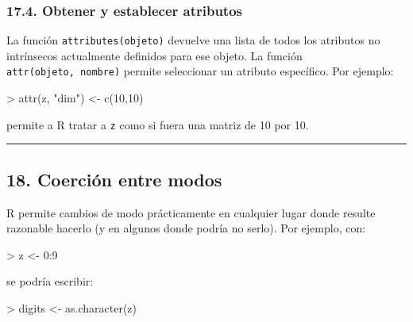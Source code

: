 \documentclass[
  jou,
  floatsintext,
  longtable,
  a4paper,
  nolmodern,
  notxfonts,
  notimes,
  12pt,
  colorlinks=true,linkcolor=blue,citecolor=blue,urlcolor=blue]{apa7}
\newenvironment{Shaded}{\begin{snugshade}}{\end{snugshade}}
\newcommand{\DecValTok}[1]{\textcolor[rgb]{0.68,0.00,0.00}{#1}}
\newcommand{\FunctionTok}[1]{\textcolor[rgb]{0.28,0.35,0.67}{#1}}
\newcommand{\NormalTok}[1]{\textcolor[rgb]{0.00,0.23,0.31}{#1}}
\newcommand{\OtherTok}[1]{\textcolor[rgb]{0.00,0.23,0.31}{#1}}
\newcommand{\SpecialCharTok}[1]{\textcolor[rgb]{0.37,0.37,0.37}{#1}}
\newcommand{\StringTok}[1]{\textcolor[rgb]{0.13,0.47,0.30}{#1}}
\begin{document}
\subsubsection{17.4. Obtener y establecer
atributos}\label{obtener-y-establecer-atributos}

La función \texttt{attributes(objeto)} devuelve una lista de todos los
atributos no intrínsecos actualmente definidos para ese objeto. La
función \texttt{attr(objeto,\ nombre)} permite seleccionar un atributo
específico. Por ejemplo:

\begin{Shaded}
\begin{Highlighting}[]
\SpecialCharTok{\textgreater{}} \FunctionTok{attr}\NormalTok{(z, }\StringTok{"dim"}\NormalTok{) }\OtherTok{\textless{}{-}} \FunctionTok{c}\NormalTok{(}\DecValTok{10}\NormalTok{,}\DecValTok{10}\NormalTok{)}
\end{Highlighting}
\end{Shaded}

permite a R tratar a \texttt{z} como si fuera una matriz de 10 por 10.

\begin{center}\rule{0.5\linewidth}{0.5pt}\end{center}

\subsection{18. Coerción entre modos}\label{coerciuxf3n-entre-modos}

R permite cambios de modo prácticamente en cualquier lugar donde resulte
razonable hacerlo (y en algunos donde podría no serlo). Por ejemplo,
con:

\begin{Shaded}
\begin{Highlighting}[]
\SpecialCharTok{\textgreater{}}\NormalTok{ z }\OtherTok{\textless{}{-}} \DecValTok{0}\SpecialCharTok{:}\DecValTok{9}
\end{Highlighting}
\end{Shaded}

se podría escribir:

\begin{Shaded}
\begin{Highlighting}[]
\SpecialCharTok{\textgreater{}}\NormalTok{ digits }\OtherTok{\textless{}{-}} \FunctionTok{as.character}\NormalTok{(z)}
\end{Highlighting}
\end{Shaded}
\end{document}
